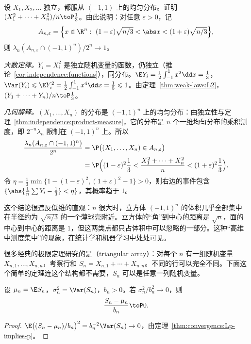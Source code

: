 \begin{workedexample}[高维立方体几乎全在一个球壳上]\label{we:weak-laws:cube}
设 $X_1,X_2,\dots$ 独立，都服从 $(-1,1)$ 上的均匀分布。证明 $(X_1^2+\cdots+X_n^2)/n\toP\frac13$。由此说明：对任意 $\varepsilon>0$，记
\[
A_{n,\varepsilon}=\Bigl\{x\in\R^n:\ (1-\varepsilon)\sqrt{n/3}<\abs x<(1+\varepsilon)\sqrt{n/3}\Bigr\},
\]
则 $\lambda_n(A_{n,\varepsilon}\cap(-1,1)^n)/2^n\to1$。
\end{workedexample}
\begin{solution}
\emph{大数定律。}$Y_i=X_i^2$ 是独立随机变量的函数，仍独立（推论~\ref{cor:independence:functions}），同分布。$\E Y_i=\frac12\int_{-1}^1x^2\dd x=\frac13$，$\Var(Y_i)\leqslant \E Y_i^2=\frac12\int_{-1}^1x^4\dd x=\frac15\leqslant1$。由定理~\ref{thm:weak-laws:L2}，$(Y_1+\cdots+Y_n)/n\toP\frac13$。

\emph{几何解释。}$(X_1,\dots,X_n)$ 的分布是 $(-1,1)^n$ 上的均匀分布：由独立性与定理~\ref{thm:independence:product-measure}，它的分布是 $n$ 个一维均匀分布的乘积测度，即 $2^{-n}\lambda_n$ 限制在 $(-1,1)^n$ 上。所以
\[
\begin{aligned}
\frac{\lambda_n(A_{n,\varepsilon}\cap(-1,1)^n)}{2^n}&=\P\bigl((X_1,\dots,X_n)\in A_{n,\varepsilon}\bigr)\\
&=\P\Bigl((1-\varepsilon)^2\frac13<\frac{X_1^2+\cdots+X_n^2}n<(1+\varepsilon)^2\frac13\Bigr).
\end{aligned}
\]
令 $\eta=\frac13\min\{1-(1-\varepsilon)^2,(1+\varepsilon)^2-1\}>0$，则右边的事件包含 $\{\abs{\frac1n\sum Y_i-\frac13}<\eta\}$，其概率趋于 $1$。

这个结论很违反低维的直观：$n$ 很大时，立方体 $(-1,1)^n$ 的体积几乎全部集中在半径约为 $\sqrt{n/3}$ 的一个薄球壳附近。立方体的“角”到中心的距离是 $\sqrt n$，面的中心到中心的距离是 $1$，但这两类点都只占体积中可以忽略的一部分。这种“高维中测度集中”的现象，在统计学和机器学习中处处可见。
\end{solution}


很多经典的极限定理研究的是（triangular array）：对每个 $n$ 有一组随机变量 $X_{n,1},\dots,X_{n,n}$，考察行和 $S_n=X_{n,1}+\cdots+X_{n,n}$。不同的行可以完全不同。下面这个简单的定理连这个结构都不需要，$S_n$ 可以是任意一列随机变量。

\begin{theorem}\label{thm:weak-laws:triangular-L2}
设 $\mu_n=\E S_n$，$\sigma_n^2=\Var(S_n)$，$b_n>0$。若 $\sigma_n^2/b_n^2\to0$，则
\[
\frac{S_n-\mu_n}{b_n}\toP0 .
\]
\end{theorem}
\begin{proof}
$\E\bigl((S_n-\mu_n)/b_n\bigr)^2=b_n^{-2}\Var(S_n)\to0$，由定理~\ref{thm:convergence:Lp-implies-p}。
\end{proof}


